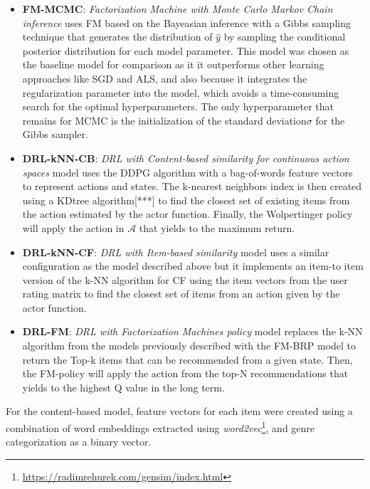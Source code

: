 \begin{itemize}
\item \textbf{FM-MCMC}: \textit{Factorization Machine with Monte Carlo Markov Chain inference}  uses FM based on the Bayeasian inference with a Gibbs sampling technique that generates the distribution of $\hat{y}$ by sampling the conditional posterior distribution for each model parameter. This model was chosen as the baseline model for comparison as it it outperforms other learning approaches like SGD and ALS, and also because it integrates the regularization parameter into the model, which avoids a time-consuming search for the optimal hyperparameters. The only hyperparameter that remains for MCMC is the initialization of the standard deviation$\sigma$ for the Gibbs sampler.
\item \textbf{DRL-kNN-CB}: \textit{DRL with Content-based similarity for continuous action spaces} model uses the DDPG algorithm with a bag-of-words feature vectors to represent actions and states. The k-nearest neighbors index is then created using a KDtree algorithm[***] to find the closest set of existing items from the action estimated by the actor function. Finally, the Wolpertinger policy will apply the action in $\mathcal{A}$ that yields to the maximum return.
\item \textbf{DRL-kNN-CF}: \textit{DRL with Item-based similarity} model uses a similar configuration as the model described above but it implements an item-to item version of the k-NN algorithm for CF using the item vectors from the user rating matrix to find the closest set of items from an action given by the actor function.
\item \textbf{DRL-FM}: \textit{DRL with Factorization Machines policy} model replaces the k-NN algorithm from the models previously described with the FM-BRP model to return the Top-k items that can be recommended from a given state. Then, the FM-policy will apply the action from the top-N recommendations that yields to the highest Q value in the long term.
\end{itemize}

For the content-based model, feature vectors for each item were created using a combination of word embeddings extracted using \textit{word2vec}\footnote{\url{https://radimrehurek.com/gensim/index.html}}, and genre categorization as a binary vector.

